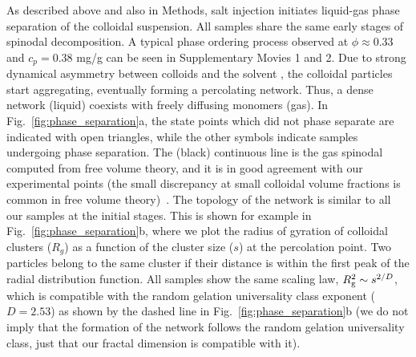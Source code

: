 \documentclass[preprint,amsmath,amssymb,superscriptaddress]{revtex4-1}
\begin{document}
As described above and also in Methods, salt injection initiates liquid-gas phase separation of the colloidal suspension. 
All samples share the same early stages of spinodal decomposition. 
A typical phase ordering process observed at $\phi\approx 0.33$ and $c_p=0.38$ mg/g can be seen in Supplementary Movies 1 and 2. 
Due to strong dynamical asymmetry between colloids and the solvent \cite{tanaka1999colloid}, the colloidal particles start aggregating, 
eventually forming a percolating network. Thus, a dense network (liquid) coexists with freely diffusing monomers (gas).
In Fig.~\ref{fig:phase_separation}a, the state points which did not phase separate are indicated with open triangles, while
the other symbols indicate samples undergoing phase separation. The (black) continuous line is the gas spinodal computed from free volume theory,
and it is in good agreement with our experimental points (the small discrepancy at small colloidal volume fractions 
is common in free volume theory)~\cite{Royall2007,lu2008gelation}. 
The topology of the network is similar to all our samples at the initial stages. 
This is shown for example in Fig.~\ref{fig:phase_separation}b, where we plot the radius of gyration of colloidal clusters ($R_g$)
as a function of the cluster size ($s$) at the percolation point. Two particles belong to the same cluster if their distance is
within the first peak of the radial distribution function. All samples show the same scaling law, $R^2_{\rm g}\sim s^{2/D}$, which is compatible with
the random gelation universality class exponent ($D=2.53$) as shown by the dashed line in Fig.~\ref{fig:phase_separation}b
(we do not imply that the formation of the network follows the random gelation universality class, just that our
fractal dimension is compatible with it).

 
\end{document}
